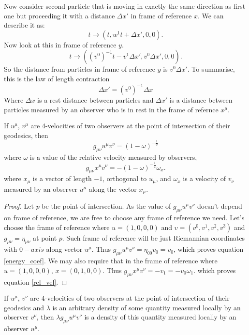 \documentclass[main.tex]{subfiles}
\begin{document}
Now consider second particle that is moving in exactly the same direction as first one but proceeding it with a distance $\Delta x'$ in frame of reference $x$. We can describe it as:
$$
t \to (t, w^1t + \Delta x', 0, 0).
$$
Now look at this in frame of reference $y$.
$$
t \to ((v^0)^{-1}t - v^1\Delta x', v^0\Delta x', 0, 0).
$$
So the distance from particles in frame of reference $y$ is $v^0\Delta x'$.
To summarise, this is the law of length contraction
\begin{equation}
\boxed{
\Delta x' = (v^0)^{-1} \Delta x
}
\end{equation}
Where $\Delta x$ is a rest distance between particles and $\Delta x'$ is a distance between particles measured by an observer who is in rest in the frame of refernce $x^\mu$.
\begin{theorem}
\label{metric_inter}
If $u^\mu$, $v^\mu$ are 4-velocities of two observers at the point of intersection of their geodesics, then 
\begin{equation}
\label{energy_coef}
g_{\mu\nu} u^\mu v^\nu = (1 - \omega)^{-\frac{1}{2}}
\end{equation}
where $\omega$ is a value of the relative velocity measured by observers,
\begin{equation}
\label{rel_vel}
g_{\mu\nu} x^\mu v^\nu = -(1 - \omega)^{-\frac{1}{2}}\omega_x.
\end{equation}
where $x_\mu$ is a vector of length $-1$, orthogonal to $u_\mu$, and $\omega_x$ is a velocity of $v_\nu$ measured by an observer $u^\mu$ along the vector $x_\mu$.
\end{theorem}
\begin{proof}
Let $p$ be the point of intersection. As the value of $g_{\mu\nu} u^\mu v^\nu$ doesn't depend on frame of reference, we are free to choose any frame of reference we need. Let's choose the frame of reference where $u = (1, 0, 0, 0)$ and $v=(v^0,v^1,v^2,v^3)$ and $g_{\mu\nu} = \eta_{\mu\nu}$ at point $p$. Such frame of reference will be just Riemannian coordinates with $0-axis$ along vector $u^\mu$. Thus $g_{\mu\nu} u^\mu v^\nu = \eta_{00} v_0 = v_0$, which proves equation \ref{energy_coef}.
We may also require that in the frame of reference where $u = (1, 0, 0, 0)$, $x = (0,1,0,0)$. Thus $g_{\mu\nu} x^\mu v^\nu = - v_1 = -v_0\omega_1$. which proves equation \ref{rel_vel}.
\end{proof}

\begin{fact}
If $u^\mu$, $v^\nu$ are 4-velocities of two observers at the point of intersection of their geodesics and
 $\lambda$ is an arbitrary density of some quantity measured locally by an observer $v^\nu$, then 
$\lambda g_{\mu\nu} u^\mu v^\nu$ is a density of this quantity measured locally by an observer $u^\mu$. 
\end{fact}
\end{document}
